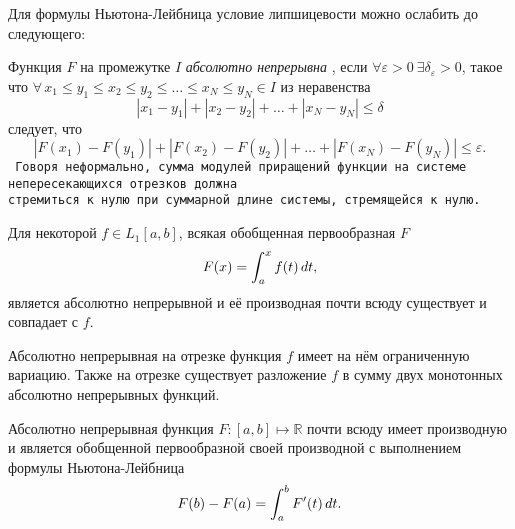 Для формулы Ньютона-Лейбница условие липшицевости можно ослабить до следующего:

\begin{to_def}
    Функция $F$ на промежутке $I$ \textit{абсолютно непрерывна} , если $\forall \varepsilon > 0 \ \exists \delta_\varepsilon > 0$, такое что
    $\forall \, x_1 \leq y_1 \leq x_2 \leq y_2 \leq \ldots \leq x_N \leq y_N \in I$ из неравенства
    \begin{equation*}
        |x_1 - y_1| + |x_2 - y_2| + \ldots + |x_N - y_N| \leq \delta
    \end{equation*}
    следует, что
    \begin{equation*}
        |F(x_1)-F(y_1)| + 
        |F(x_2)-F(y_2)| + 
        \ldots +
        |F(x_N)-F(y_N)| \leq \varepsilon.
    \end{equation*}
    \texttt{
    Говоря неформально, сумма модулей приращений функции на системе непересекающихся отрезков должна \\ стремиться к нулю при суммарной длине системы, стремящейся к нулю.
    } 
\end{to_def}

\begin{to_lem}
    
\end{to_lem}


\begin{to_thr}[]
    Для некоторой $f \in L_1 [a, b]$, всякая обобщенная первообразная $F$ 
    \begin{equation*}
        F(x) = \int_a^x f(t) \, d t,
    \end{equation*}
     является абсолютно непрерывной и её производная почти всюду существует и совпадает с $f$.
\end{to_thr}


\begin{to_lem}
    Абсолютно непрерывная на отрезке функция $f$ имеет на нём ограниченную вариацию. Также на отрезке существует разложение $f$ в сумму двух монотонных абсолютно непрерывных функций.
\end{to_lem}


\begin{to_thr}[]
    Абсолютно непрерывная функция $F \colon [a, b] \mapsto \mathbb{R}$ почти всюду имеет производную и является обобщенной первообразной своей производной с выполнением формулы Ньютона-Лейбница
    \begin{equation*}
        F(b) - F(a) = \int_a^b F' (t) \, d t.
    \end{equation*}
\end{to_thr}

